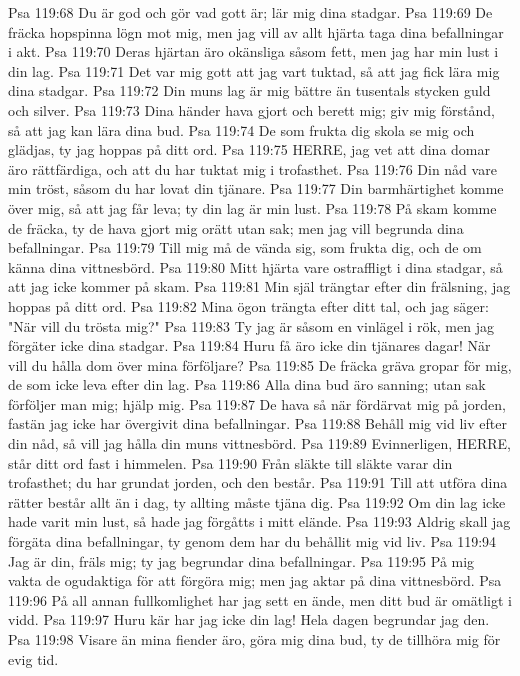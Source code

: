 Psa 119:68  Du är god och gör vad gott är; lär mig dina stadgar.
Psa 119:69  De fräcka hopspinna lögn mot mig, men jag vill av allt hjärta taga dina befallningar i akt.
Psa 119:70  Deras hjärtan äro okänsliga såsom fett, men jag har min lust i din lag.
Psa 119:71  Det var mig gott att jag vart tuktad, så att jag fick lära mig dina stadgar.
Psa 119:72  Din muns lag är mig bättre än tusentals stycken guld och silver.
Psa 119:73  Dina händer hava gjort och berett mig; giv mig förstånd, så att jag kan lära dina bud.
Psa 119:74  De som frukta dig skola se mig och glädjas, ty jag hoppas på ditt ord.
Psa 119:75  HERRE, jag vet att dina domar äro rättfärdiga, och att du har tuktat mig i trofasthet.
Psa 119:76  Din nåd vare min tröst, såsom du har lovat din tjänare.
Psa 119:77  Din barmhärtighet komme över mig, så att jag får leva; ty din lag är min lust.
Psa 119:78  På skam komme de fräcka, ty de hava gjort mig orätt utan sak; men jag vill begrunda dina befallningar.
Psa 119:79  Till mig må de vända sig, som frukta dig, och de om känna dina vittnesbörd.
Psa 119:80  Mitt hjärta vare ostraffligt i dina stadgar, så att jag icke kommer på skam.
Psa 119:81  Min själ trängtar efter din frälsning, jag hoppas på ditt ord.
Psa 119:82  Mina ögon trängta efter ditt tal, och jag säger: "När vill du trösta mig?"
Psa 119:83  Ty jag är såsom en vinlägel i rök, men jag förgäter icke dina stadgar.
Psa 119:84  Huru få äro icke din tjänares dagar! När vill du hålla dom över mina förföljare?
Psa 119:85  De fräcka gräva gropar för mig, de som icke leva efter din lag.
Psa 119:86  Alla dina bud äro sanning; utan sak förföljer man mig; hjälp mig.
Psa 119:87  De hava så när fördärvat mig på jorden, fastän jag icke har övergivit dina befallningar.
Psa 119:88  Behåll mig vid liv efter din nåd, så vill jag hålla din muns vittnesbörd.
Psa 119:89  Evinnerligen, HERRE, står ditt ord fast i himmelen.
Psa 119:90  Från släkte till släkte varar din trofasthet; du har grundat jorden, och den består.
Psa 119:91  Till att utföra dina rätter består allt än i dag, ty allting måste tjäna dig.
Psa 119:92  Om din lag icke hade varit min lust, så hade jag förgåtts i mitt elände.
Psa 119:93  Aldrig skall jag förgäta dina befallningar, ty genom dem har du behållit mig vid liv.
Psa 119:94  Jag är din, fräls mig; ty jag begrundar dina befallningar.
Psa 119:95  På mig vakta de ogudaktiga för att förgöra mig; men jag aktar på dina vittnesbörd.
Psa 119:96  På all annan fullkomlighet har jag sett en ände, men ditt bud är omätligt i vidd.
Psa 119:97  Huru kär har jag icke din lag! Hela dagen begrundar jag den.
Psa 119:98  Visare än mina fiender äro, göra mig dina bud, ty de tillhöra mig för evig tid.
